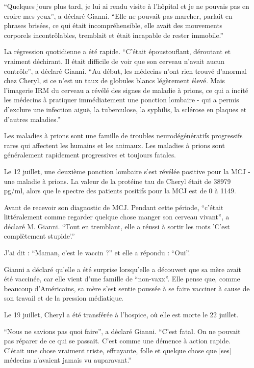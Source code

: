“Quelques jours plus tard, je lui ai rendu visite à l'hôpital et je ne pouvais
pas en croire mes yeux”, a déclaré Gianni. “Elle ne pouvait pas marcher, parlait
en phrases brisées, ce qui était incompréhensible, elle avait des mouvements
corporels incontrôlables, tremblait et était incapable de rester immobile.”

La régression quotidienne a été rapide. “C'était époustouflant, déroutant et
vraiment déchirant. Il était difficile de voir que son cerveau n'avait aucun
contrôle”, a déclaré Gianni. “Au début, les médecins n'ont rien trouvé d'anormal
chez Cheryl, si ce n'est un taux de globules blancs légèrement élevé. Mais
l'imagerie IRM du cerveau a révélé des signes de maladie à prions, ce qui a
incité les médecins à pratiquer immédiatement une ponction lombaire - qui a
permis d'exclure une infection aiguë, la tuberculose, la syphilis, la sclérose
en plaques et d'autres maladies.”

Les maladies à prions sont une famille de troubles neurodégénératifs progressifs
rares qui affectent les humains et les animaux. Les maladies à prions sont
généralement rapidement progressives et toujours fatales.

Le 12 juillet, une deuxième ponction lombaire s'est révélée positive pour la MCJ
- une maladie à prions. La valeur de la protéine tau de Cheryl était de 38979
pg/ml, alors que le spectre des patients positifs pour la MCJ est de 0 à 1149.

Avant de recevoir son diagnostic de MCJ. Pendant cette période, “c'était
littéralement comme regarder quelque chose manger son cerveau vivant”, a déclaré
M. Gianni. “Tout en tremblant, elle a réussi à sortir les mots 'C'est
complètement stupide'.”

J'ai dit : “Maman, c'est le vaccin ?” et elle a répondu : “Oui”.

Gianni a déclaré qu'elle a été surprise lorsqu'elle a découvert que sa mère
avait été vaccinée, car elle vient d'une famille de “non-vaxx”. Elle pense que,
comme beaucoup d'Américains, sa mère s'est sentie poussée à se faire vacciner à
cause de son travail et de la pression médiatique.

Le 19 juillet, Cheryl a été transférée à l'hospice, où elle est morte le 22
juillet.

“Nous ne savions pas quoi faire”, a déclaré Gianni. “C'est fatal. On ne pouvait
pas réparer de ce qui se passait. C'est comme une démence à action
rapide. C'était une chose vraiment triste, effrayante, folle et quelque chose
que [ses] médecins n'avaient jamais vu auparavant.”


